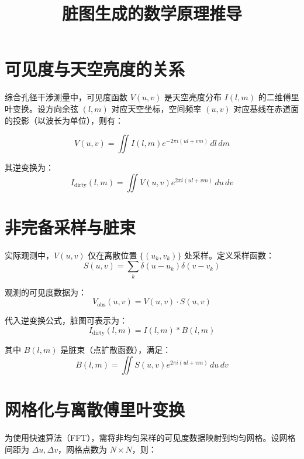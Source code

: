 \documentclass{article}
\title{脏图生成的数学原理推导}
\author{}
\date{}
\begin{document}
\maketitle

\section{可见度与天空亮度的关系}
综合孔径干涉测量中，可见度函数 $ V(u,v) $ 是天空亮度分布 $ I(l,m) $ 的二维傅里叶变换。设方向余弦 $ (l,m) $ 对应天空坐标，空间频率 $ (u,v) $ 对应基线在赤道面的投影（以波长为单位），则有：

\begin{equation}
V(u,v) = \iint I(l,m) e^{-2\pi i (ul + vm)} \, dl \, dm
\label{eq:fourier}
\end{equation}

其逆变换为：
\begin{equation}
I_{\text{dirty}}(l,m) = \iint V(u,v) e^{2\pi i (ul + vm)} \, du \, dv
\label{eq:inv_fourier}
\end{equation}

\section{非完备采样与脏束}
实际观测中，$ V(u,v) $ 仅在离散位置 $ \{(u_k,v_k)\} $ 处采样。定义采样函数：
\begin{equation}
S(u,v) = \sum_{k} \delta(u - u_k) \delta(v - v_k)
\end{equation}

观测的可见度数据为：
\begin{equation}
V_{\text{obs}}(u,v) = V(u,v) \cdot S(u,v)
\end{equation}

代入逆变换公式，脏图可表示为：
\begin{equation}
I_{\text{dirty}}(l,m) = I(l,m) \ast B(l,m)
\end{equation}

其中 $ B(l,m) $ 是脏束（点扩散函数），满足：
\begin{equation}
B(l,m) = \iint S(u,v) e^{2\pi i (ul + vm)} \, du \, dv
\label{eq:dirty_beam}
\end{equation}

\section{网格化与离散傅里叶变换}
为使用快速算法（FFT），需将非均匀采样的可见度数据映射到均匀网格。设网格间距为 $ \Delta u, \Delta v $，网格点数为 $ N \times N $，则：
\end{document}

